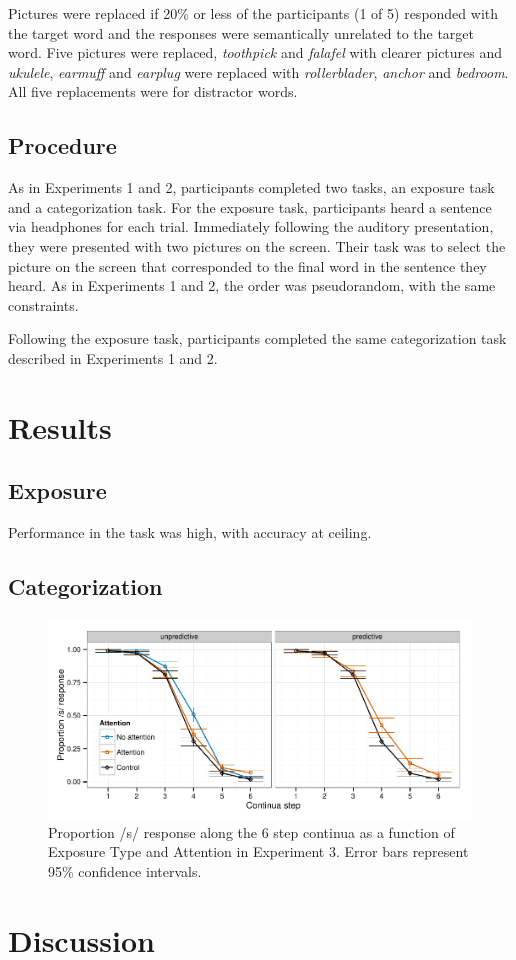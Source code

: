 Pictures were replaced if 20\% or less of the participants (1 of 5) responded with the target word and the responses were semantically unrelated to the target word. 
Five pictures were replaced, \emph{toothpick} and \emph{falafel} with clearer pictures and \emph{ukulele}, \emph{earmuff} and \emph{earplug} were replaced with \emph{rollerblader}, \emph{anchor} and \emph{bedroom}.  
All five replacements were for distractor words.

\subsection{Procedure}

As in Experiments 1 and 2, participants completed two tasks, an exposure task and a categorization task.  For the exposure task, participants heard a sentence via headphones for each trial.  Immediately following the auditory presentation, they were presented with two pictures on the screen.  Their task was to select the picture on the screen that corresponded to the final word in the sentence they heard.  As in Experiments 1 and 2, the order was pseudorandom, with the same constraints.

Following the exposure task, participants completed the same categorization task described in Experiments 1 and 2.

\section{Results}

\subsection{Exposure}

Performance in the task was high, with accuracy at ceiling.

\subsection{Categorization}



\begin{figure}[!ht]
\caption{Proportion /s/ response along the 6 step continua as a function of Exposure Type and Attention in Experiment 3.  Error bars represent 95\% confidence intervals.}
\label{fig:exp3categ}
\begin{center}
\includegraphics[width=\textwidth]{graphs/exp3_categresults}
\end{center}
\end{figure}

\section{Discussion}
